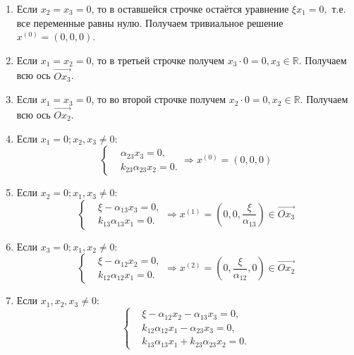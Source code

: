     \begin{enumerate}
        \item Если \( x_2 = x_3 = 0 \), то в оставшейся строчке остаётся уравнение \( \xi x_1 = 0, \) т.е. все переменные равны нулю. Получаем тривиальное решение \( x^{(0)} = (0,0,0) \).
        \item Если \( x_1 = x_2 = 0 \), то в третьей строчке получем \( x_3 \cdot 0 = 0, x_3 \in \mathbb{R} \). Получаем всю ось \( \overrightarrow{Ox_3} \).
        \item Если \( x_1 = x_3 = 0 \), то во второй строчке получем \( x_2 \cdot 0 = 0, x_2 \in \mathbb{R} \). Получаем всю ось \( \overrightarrow{Ox_2} \).
        \item Если \( x_1 = 0; x_2, x_3 \neq 0 \):
            \[
                \left\{\begin{split}
                    & \alpha_{23} x_3 = 0, \\
                    & k_{23} \alpha_{23} x_2 = 0. 
                \end{split}\right.
                \Rightarrow
                x^{(0)} = \left( 0,0, 0\right)
            \]
        \item Если \( x_2 = 0; x_1, x_3 \neq 0 \):
            \[
                \left\{\begin{split}
                    & \xi - \alpha_{13} x_3 = 0, \\
                    & k_{13} \alpha_{13} x_1 = 0. 
                \end{split}\right.
                \Rightarrow
                x^{(1)} = \left( 0, 0, \frac{\xi}{\alpha_{13}} \right) \in \overrightarrow{Ox_3}
            \]
        \item Если \( x_3 = 0; x_1, x_2 \neq 0 \):
            \[
                \left\{\begin{split}
                    & \xi - \alpha_{12} x_2 = 0, \\
                    & k_{12} \alpha_{12} x_1 = 0. 
                \end{split}\right.
                \Rightarrow
                x^{(2)} = \left( 0, \frac{\xi}{\alpha_{12}}, 0 \right)\in \overrightarrow{Ox_2}
            \]
        \item Если \( x_1, x_2, x_3 \neq 0 \):
            \[
                \left\{\begin{split}
                    & \xi - \alpha_{12} x_2 - \alpha_{13} x_3 = 0, \\
                    & k_{12} \alpha_{12} x_1 - \alpha_{23} x_3 = 0, \\
                    & k_{13} \alpha_{13} x_1 + k_{23} \alpha_{23} x_2 = 0. 
                \end{split}\right.
            \]


\end{enumerate}
